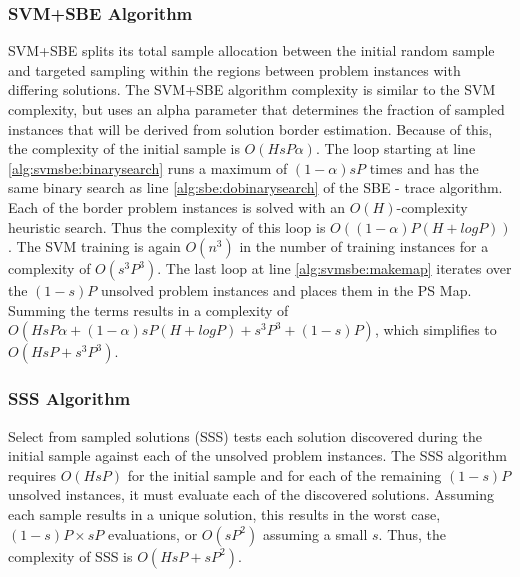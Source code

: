 \subsubsection{SVM+SBE Algorithm} SVM+SBE splits its total sample allocation between the initial random sample and targeted sampling within the regions between problem instances with differing solutions.  The SVM+SBE algorithm complexity is similar to the SVM complexity, but uses an alpha parameter that determines the fraction of sampled instances that will be derived from solution border estimation.  Because of this, the complexity of the initial sample is $O(HsP\alpha)$.  The loop starting at line \ref{alg:svmsbe:binarysearch} runs a maximum of $(1-\alpha)sP$ times and has the same binary search as line \ref{alg:sbe:dobinarysearch} of the SBE - trace algorithm.  Each of the border problem instances is solved with an $O(H)$-complexity heuristic search.  Thus the complexity of this loop is $O((1-\alpha)P(H+logP))$.  The SVM training is again $O(n^3)$ in the number of training instances for a complexity of $O(s^3P^3)$.  The last loop at line \ref{alg:svmsbe:makemap} iterates over the $(1-s)P$ unsolved problem instances and places them in the PS Map.  Summing the terms results in a complexity of $O(HsP\alpha + (1-\alpha)sP(H+logP) + s^3P^3 + (1-s)P)$, which simplifies to  $O(HsP + s^3P^3)$.

\subsubsection{SSS Algorithm} Select from sampled solutions (SSS) tests each solution discovered during the initial sample against each of the unsolved problem instances.  The SSS algorithm requires $O(HsP)$ for the initial sample and for each of  the remaining $(1-s)P$ unsolved instances, it must evaluate each of the discovered solutions.  Assuming each sample results in a unique solution, this results in the worst case, $(1-s)P \times sP$ evaluations, or $O(sP^2)$ assuming a small $s$.  Thus, the complexity of SSS is $O(HsP + sP^2)$.

